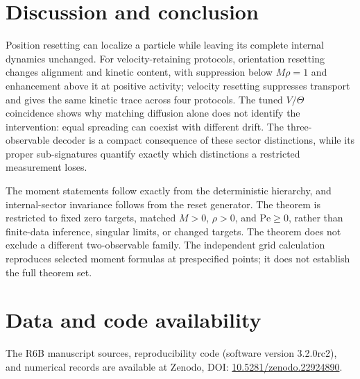 \section{Discussion and conclusion}\label{discussion}

Position resetting can localize a particle while leaving its complete internal dynamics unchanged. For velocity-retaining protocols, orientation resetting changes alignment and kinetic content, with suppression below $M\rho=1$ and enhancement above it at positive activity; velocity resetting suppresses transport and gives the same kinetic trace across four protocols. The tuned $V/\Theta$ coincidence shows why matching diffusion alone does not identify the intervention: equal spreading can coexist with different drift. The three-observable decoder is a compact consequence of these sector distinctions, while its proper sub-signatures quantify exactly which distinctions a restricted measurement loses.

The moment statements follow exactly from the deterministic hierarchy, and internal-sector invariance follows from the reset generator. The theorem is restricted to fixed zero targets, matched $M>0$, $\rho>0$, and $\mathrm{Pe}\ge0$, rather than finite-data inference, singular limits, or changed targets. The theorem does not exclude a different two-observable family. The independent grid calculation reproduces selected moment formulas at prespecified points; it does not establish the full theorem set.

\section{Data and code availability}\label{data-and-code-availability}

The R6B manuscript sources, reproducibility code (software version 3.2.0rc2), and numerical records are available at Zenodo, DOI: \href{https://doi.org/10.5281/zenodo.22924890}{10.5281/zenodo.22924890}.
